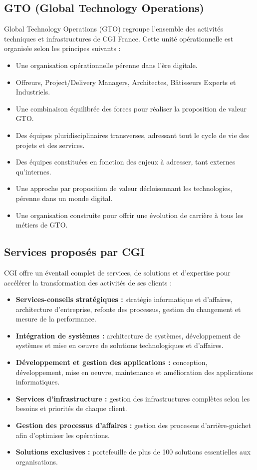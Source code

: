 \subsection{GTO (Global Technology Operations)}
Global Technology Operations (GTO) regroupe l'ensemble des activités techniques et infrastructures de CGI France. Cette unité opérationnelle est organisée selon les principes suivants :

\begin{itemize}
  \item Une organisation opérationnelle pérenne dans l'ère digitale.
  \item Offreurs, Project/Delivery Managers, Architectes, Bâtisseurs Experts et Industriels.
  \item Une combinaison équilibrée des forces pour réaliser la proposition de valeur GTO.
  \item Des équipes pluridisciplinaires transverses, adressant tout le cycle de vie des projets et des services.
  \item Des équipes constituées en fonction des enjeux à adresser, tant externes qu'internes.
  \item Une approche par proposition de valeur décloisonnant les technologies, pérenne dans un monde digital.
  \item Une organisation construite pour offrir une évolution de carrière à tous les métiers de GTO.
\end{itemize}

\subsection{Services proposés par CGI}
CGI offre un éventail complet de services, de solutions et d'expertise pour accélérer la transformation des activités de ses clients :

\begin{itemize}
  \item \textbf{Services-conseils stratégiques :} stratégie informatique et d'affaires, architecture d'entreprise, refonte des processus, gestion du changement et mesure de la performance.
  
  \item \textbf{Intégration de systèmes :} architecture de systèmes, développement de systèmes et mise en oeuvre de solutions technologiques et d'affaires.
  
  \item \textbf{Développement et gestion des applications :} conception, développement, mise en oeuvre, maintenance et amélioration des applications informatiques.
  
  \item \textbf{Services d'infrastructure :} gestion des infrastructures complètes selon les besoins et priorités de chaque client.
  
  \item \textbf{Gestion des processus d'affaires :} gestion des processus d'arrière-guichet afin d'optimiser les opérations.
  
  \item \textbf{Solutions exclusives :} portefeuille de plus de 100 solutions essentielles aux organisations.
\end{itemize}

